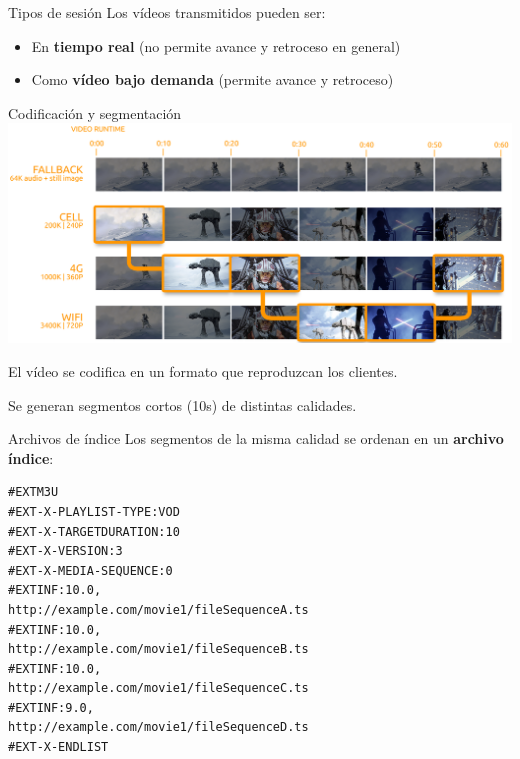 \documentclass[10pt,compress,usetitleprogressbar,mathserif]{beamer}
\begin{document}
\begin{frame}{Tipos de sesión}
  Los vídeos transmitidos pueden ser:
  \begin{itemize}
    \item En \textbf{tiempo real} (no permite avance y retroceso en general)
    \item Como \textbf{vídeo bajo demanda} (permite avance y retroceso)
  \end{itemize}
\end{frame}

\begin{frame}{Codificación y segmentación}
  \includegraphics[scale=0.9]{img/timestamp.png}

  El vídeo se codifica en un formato que reproduzcan los clientes.

  Se generan segmentos cortos (10s) de distintas calidades.
\end{frame}

\begin{frame}[fragile]{Archivos de índice}
  Los segmentos de la misma calidad se ordenan en un \textbf{archivo índice}:

\begin{lstlisting}
#EXTM3U
#EXT-X-PLAYLIST-TYPE:VOD
#EXT-X-TARGETDURATION:10
#EXT-X-VERSION:3
#EXT-X-MEDIA-SEQUENCE:0
#EXTINF:10.0,
http://example.com/movie1/fileSequenceA.ts
#EXTINF:10.0,
http://example.com/movie1/fileSequenceB.ts
#EXTINF:10.0,
http://example.com/movie1/fileSequenceC.ts
#EXTINF:9.0,
http://example.com/movie1/fileSequenceD.ts
#EXT-X-ENDLIST
\end{lstlisting}
\end{frame}
\end{document}
